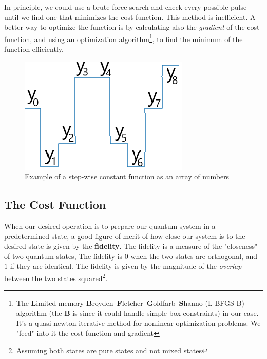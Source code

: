 In principle, we could use a brute-force search and check every possible pulse until we find one that minimizes the cost function. This method is inefficient. A better way to optimize the function is by calculating also the \textit{gradient} of the cost function, and using an optimization algorithm\footnote{The \textbf{L}imited memory \textbf{B}royden–\textbf{F}letcher–\textbf{G}oldfarb–\textbf{S}hanno (L-BFGS-B) algorithm (the \textbf{B} is since it could handle simple box constraints) in our case. It's a quasi-newton iterative method for nonlinear optimization problems. We "feed" into it the cost function and gradient}, to find the minimum of the function efficiently.
\begin{figure}[H]
    \centering
    \includegraphics[width=0.3\columnwidth]{step-wise_example.png} %
    \caption{Example of a step-wise constant function as an array of numbers}
    \label{fig:step-wise-const}
\end{figure}
\subsection{The Cost Function}
When our desired operation is to prepare our quantum system in a predetermined state, a good figure of merit of how close our system is to the desired state is given by the \textbf{fidelity}. The fidelity is a measure of the "closeness" of two quantum states, The fidelity is $0$ when the two states are orthogonal, and $1$ if they are identical. The fidelity is given by the magnitude of the \textit{overlap} between the two states squared\footnote{Assuming both states are pure states and not mixed states}.

